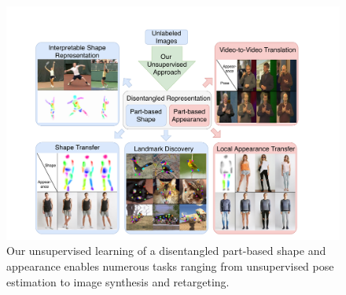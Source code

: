 \begin{figure}
	\centering
	\includegraphics[trim={4.5cm 0.5cm 6.3cm 0cm},clip, width=1.\linewidth]{fig/front_final.pdf}
	\caption{Our unsupervised learning of a disentangled part-based shape and appearance enables numerous tasks ranging from unsupervised pose estimation to image synthesis and retargeting.} %
	\label{fig:firstpage}
\end{figure}
